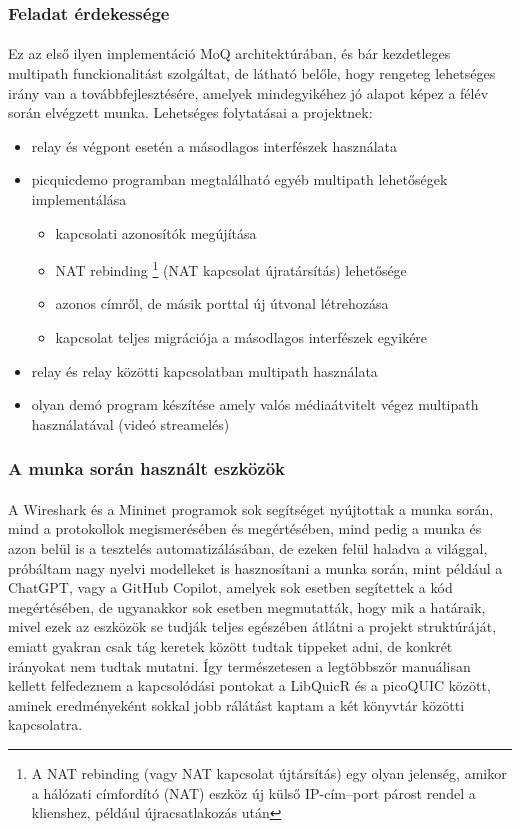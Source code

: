 \documentclass[a4paper,oneside]{article}
\begin{document}
\subsubsection{Feladat érdekessége}
\paragraph{}

Ez az első ilyen implementáció MoQ architektúrában, és bár kezdetleges multipath funckionalitást szolgáltat,
de látható belőle, hogy rengeteg lehetséges irány van a továbbfejlesztésére, amelyek mindegyikéhez jó alapot 
képez a félév során elvégzett munka. Lehetséges folytatásai a projektnek:
\begin{itemize}
  \item relay és végpont esetén a másodlagos interfészek használata
  \item picquicdemo programban megtalálható egyéb multipath lehetőségek implementálása
  \begin{itemize}
    \item kapcsolati azonosítók megújítása
    \item NAT rebinding \footnote{A NAT rebinding (vagy NAT kapcsolat újtársítás) egy olyan jelenség, 
    amikor a hálózati címfordító (NAT) eszköz új külső IP-cím–port párost rendel a klienshez, 
    például újracsatlakozás után} (NAT kapcsolat újratársítás) lehetősége
    \item azonos címről, de másik porttal új útvonal létrehozása
    \item kapcsolat teljes migrációja a másodlagos interfészek egyikére
  \end{itemize} 
  \item relay és relay közötti kapcsolatban multipath használata
  \item olyan demó program készítése amely valós médiaátvitelt végez multipath használatával (videó streamelés)
\end{itemize}

\subsubsection{A munka során használt eszközök}
\paragraph{}
A Wireshark és a Mininet programok sok segítséget nyújtottak a munka során, mind a protokollok 
megismerésében és megértésében, mind pedig a munka és azon belül is a tesztelés automatizálásában, de ezeken 
felül haladva a világgal, próbáltam nagy nyelvi modelleket is hasznosítani a munka során, mint például a ChatGPT, vagy a GitHub Copilot,
amelyek sok esetben segítettek a kód megértésében, de ugyanakkor sok esetben megmutatták, hogy mik a határaik, mivel 
ezek az eszközök se tudják teljes egészében átlátni a projekt struktúráját, emiatt gyakran csak tág keretek között tudtak tippeket adni, de konkrét
irányokat nem tudtak mutatni. Így természetesen a legtöbbször manuálisan kellett felfedeznem a kapcsolódási pontokat a LibQuicR és a picoQUIC között,
aminek eredményeként sokkal jobb rálátást kaptam a két könyvtár közötti kapcsolatra.
\end{document}

